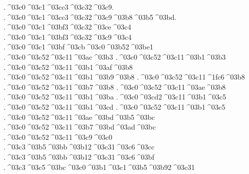 {	.^^^^03c0^^^^03c1^^^^03cc3^^^^03c32^^^^03c9.
	.^^^^03c0^^^^03c1^^^^03cc3^^^^03c32^^^^03c9^^^^03b8^^^^03b5^^^^03bd.
	.^^^^03c0^^^^03c1^^^^03bf3^^^^03c32^^^^03ce^^^^03c4 		%
	.^^^^03c0^^^^03c1^^^^03bf3^^^^03c32^^^^03c9^^^^03c4
.^^^^03c0^^^^03c1^^^^03bf^^^^03cb^^^^03c0^^^^03b52^^^^03be1 		%
.^^^^03c0^^^^03c52^^^^03c11^^^^03ac^^^^03b3		%
.^^^^03c0^^^^03c52^^^^03c11^^^^03b1^^^^03b3
.^^^^03c0^^^^03c52^^^^03c11^^^^03b1^^^^03af^^^^03b8   		%
.^^^^03c0^^^^03c52^^^^03c11^^^^03b1^^^^03b9^^^^03b8		%
.^^^^03c0^^^^03c52^^^^03c11^^^^1fc6^^^^03b8 		%
.^^^^03c0^^^^03c52^^^^03c11^^^^03b7^^^^03b8 		%
.^^^^03c0^^^^03c52^^^^03c11^^^^03ae^^^^03b8 		%
.^^^^03c0^^^^03c52^^^^03c11^^^^03b1^^^^03ba   		%
.^^^^03c0^^^^03cd2^^^^03c11^^^^03b1^^^^03c5		%
.^^^^03c0^^^^03c52^^^^03c11^^^^03b1^^^^03cd
.^^^^03c0^^^^03c52^^^^03c11^^^^03b1^^^^03c5 		%
.^^^^03c0^^^^03c52^^^^03c11^^^^03ae^^^^03bd^^^^03b5^^^^03bc 		%
.^^^^03c0^^^^03c52^^^^03c11^^^^03b7^^^^03bd^^^^03ad^^^^03bc
.^^^^03c0^^^^03c52^^^^03c11^^^^03c9^^^^03c0 		%
.^^^^03c3^^^^03b5^^^^03bb^^^^03b12^^^^03c31^^^^03c6^^^^03cc		%
.^^^^03c3^^^^03b5^^^^03bb^^^^03b12^^^^03c31^^^^03c6^^^^03bf
.^^^^03c3^^^^03c5^^^^03bc^^^^03c0^^^^03b1^^^^03c1^^^^03b5^^^^03b92^^^^03c31 		%
}
